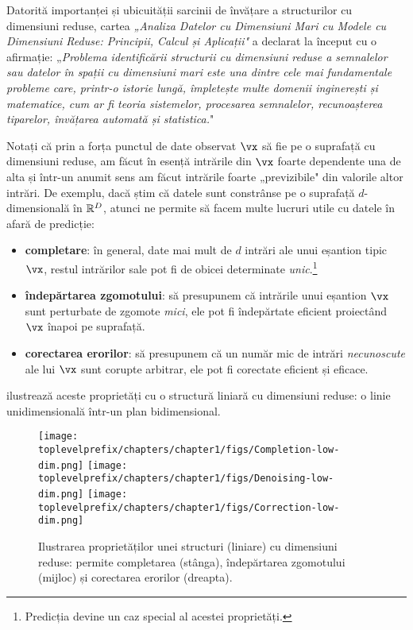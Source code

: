 \documentclass[../../book-main_ro.tex]{subfiles}
\begin{document}
Datorită importanței și ubicuității sarcinii de învățare a structurilor cu dimensiuni reduse, cartea {\em „Analiza Datelor cu Dimensiuni Mari cu Modele cu Dimensiuni Reduse: Principii, Calcul și Aplicații"} \cite{Wright-Ma-2022} a declarat la început cu o afirmație: „{\em Problema identificării structurii cu dimensiuni reduse a semnalelor sau datelor în spații cu dimensiuni mari este una dintre cele mai fundamentale probleme care, printr-o istorie lungă, împletește multe domenii inginerești și matematice, cum ar fi teoria sistemelor, procesarea semnalelor, recunoașterea tiparelor, învățarea automată și statistica.}"

Notați că prin a forța punctul de date observat $\vx$ să fie pe o suprafață cu dimensiuni reduse, am făcut în esență intrările din $\vx$ foarte dependente una de alta și într-un anumit sens am făcut intrările foarte „previzibile" din valorile altor intrări. De exemplu, dacă știm că datele sunt constrânse pe o suprafață $d$-dimensională în $\mathbb{R}^D$, atunci ne permite să facem multe lucruri utile cu datele în afară de predicție:
\begin{itemize}
    \item \textbf{completare}: în general, date mai mult de $d$ intrări ale unui eșantion tipic $\vx$, restul intrărilor sale pot fi de obicei determinate {\em unic}.\footnote{Predicția devine un caz special al acestei proprietăți.}
    \item \textbf{îndepărtarea zgomotului}: să presupunem că intrările unui eșantion $\vx$ sunt perturbate de zgomote {\em mici}, ele pot fi îndepărtate eficient proiectând $\vx$ înapoi pe suprafață.
    \item \textbf{corectarea erorilor}: să presupunem că un număr mic de intrări {\em necunoscute} ale lui $\vx$ sunt corupte arbitrar, ele pot fi corectate eficient și eficace.
\end{itemize}
 ilustrează aceste proprietăți cu o structură liniară cu dimensiuni reduse: o linie unidimensională într-un plan bidimensional.

\begin{figure}
    \centering
    \texttt{[image: \\toplevelprefix/chapters/chapter1/figs/Completion-low-dim.png]}     \texttt{[image: \\toplevelprefix/chapters/chapter1/figs/Denoising-low-dim.png]} \texttt{[image: \\toplevelprefix/chapters/chapter1/figs/Correction-low-dim.png]}
    \caption{Ilustrarea proprietăților unei structuri (liniare) cu dimensiuni reduse: permite completarea (stânga), îndepărtarea zgomotului (mijloc) și corectarea erorilor (dreapta).}
    \label{fig:low-dim-properties}
\end{figure}
\end{document}
